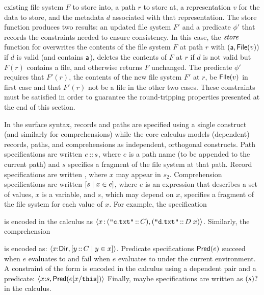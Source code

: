existing file system $F$ to store into, a path $r$ to store at, a
representation $v$ for the data to store, and the metadata $d$ associated
with that representation.  The store function
produces two results: an updated file system $F'$ and a predicate
$\phi'$ that records the constraints needed to ensure
consistency. In this case, the $\mathit{store}_{}$ function for \pfile{}
overwrites the contents of the file system $F$ at path $r$ with
$(\mathsf{a},\mathsf{File}(v))$ if $d$ is valid (and contains $\mathsf{a}$), deletes the
contents of $F$ at $r$ if $d$ is not valid but $F(r)$ contains a file,
and otherwise returns $F$ unchanged. The predicate $\phi'$ requires
that $F'(r)$, the contents of the new file system $F'$ at $r$, be
$\mathsf{File}(v)$ in first case and that $F'(r)$ not be a file in the other
two cases. These constraints must be satisfied in order to guarantee
the round-tripping properties presented at the end of this section.


In the \forest{} surface syntax, records and paths are specified using
a single construct (and similarly for comprehensions) while the core
calculus models (dependent) records, paths, and comprehensions as
independent, orthogonal constructs.  Path specifications are written
$e\,{::}\,s$, where $e$ is a path name (to be appended to the
current path) and $s$ specifies a fragment of the file system at that
path. Record specifications are written , where $x$
may appear in $s_2$. Comprehension specifications are written
$[ s \mid x \in e ]$, where $e$ is an expression that describes a set of
values, $x$ is a variable, and $s$, which may depend on $x$, specifies
a fragment of the file system for each value of $x$.  For example, the
specification
\begin{center}
\end{center}
is encoded in the calculus as
%
\(
\langle x\, {:} \,(\texttt{"}\mathtt{c.txt}\texttt{"}\,{::}\,C), (\texttt{"}\mathtt{d.txt}\texttt{"}\,{::}\,D\; x) \rangle 
\).
Similarly, the comprehension
\begin{center}
\cd{[c :: C | c <- \kw{matches} (GL "*")]} 
\end{center}
is encoded as: \(\langle x {:} \mathsf{Dir}, [ y\,{::}\,C \mid y \in x ] \rangle
\). Predicate specifications $\mathsf{Pred}(e)$ succeed when $e$ evaluates to
\True{} and fail when $e$ evaluates to \False{} under the current
environment.  A \forest{} constraint of the form 
is encoded in the calculus using a dependent pair and a predicate:
$\langle x {:} s, \mathsf{Pred}(e[x/\mathtt{this}]) \rangle$ Finally, maybe
specifications are written as $(s)?$ in the calculus.

